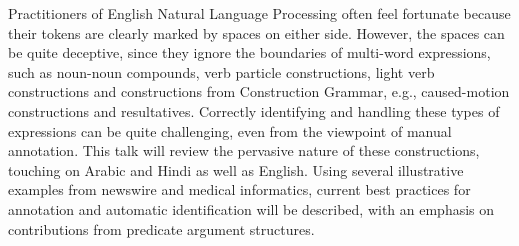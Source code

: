 Practitioners of English Natural Language Processing often feel fortunate because their tokens are clearly marked by spaces on either side. However, the
 spaces can be quite deceptive, since they ignore the boundaries of multi-word
 expressions, such as noun-noun compounds, verb particle constructions, light
 verb constructions and constructions from Construction Grammar, e.g.,
 caused-motion constructions and resultatives. Correctly identifying and
 handling these types of expressions can be quite challenging, even from the
 viewpoint of manual annotation. This talk will review the pervasive nature of
 these constructions, touching on Arabic and Hindi as well as English. Using
 several illustrative examples from newswire and medical informatics, current
 best practices for annotation and automatic identification will be described,
 with an emphasis on contributions from predicate argument structures.

